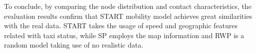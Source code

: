 To conclude, by comparing the node distribution and contact characteristics, the evaluation results confirm that START mobility model achieves great similarities with the real data. START takes the usage of speed and geographic features related with taxi status, while SP employs the map information and RWP is a random model taking use of no realistic data.


\begin{figure}[!t]
\centering
{}
\end{figure}

